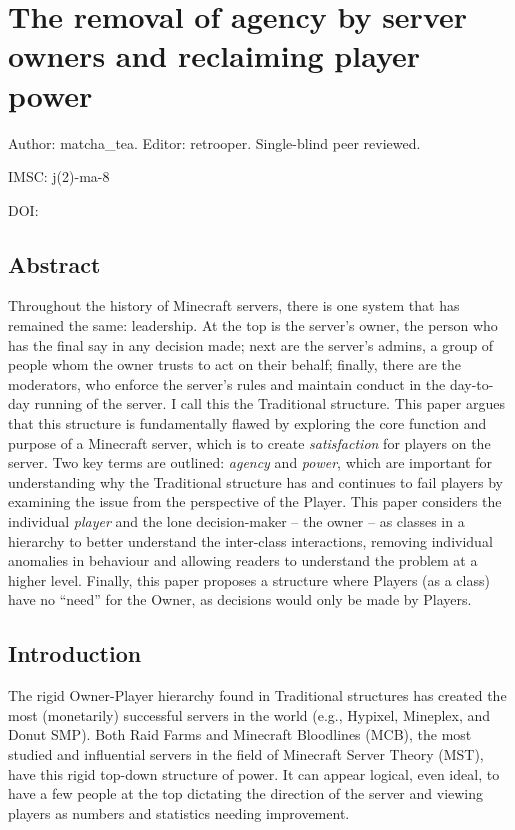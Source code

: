 \chapter{The removal of agency by server owners and reclaiming player power}

\begin{center}
    Author: matcha\_tea. Editor: retrooper. Single-blind peer reviewed. %
\end{center}

\begin{flushright}
    IMSC: j(2)-ma-8

    DOI: 
\end{flushright}


\section*{Abstract}
Throughout the history of Minecraft servers, there is one system that has remained the same: leadership. At the top is the server’s owner, the person who has the final say in any decision made; next are the server’s admins, a group of people whom the owner trusts to act on their behalf; finally, there are the moderators, who enforce the server’s rules and maintain conduct in the day-to-day running of the server. I call this the Traditional structure. This paper argues that this structure is fundamentally flawed by exploring the core function and purpose of a Minecraft server, which is to create \emph{satisfaction} for players on the server. Two key terms are outlined: \emph{agency} and \emph{power}, which are important for understanding why the Traditional structure has and continues to fail players by examining the issue from the perspective of the Player. This paper considers the individual \emph{player} and the lone decision-maker – the owner – as classes in a hierarchy to better understand the inter-class interactions, removing individual anomalies in behaviour and allowing readers to understand the problem at a higher level. Finally, this paper proposes a structure where Players (as a class) have no “need” for the Owner, as decisions would only be made by Players.

\section{Introduction}
The rigid Owner-Player hierarchy found in Traditional structures has created the most (monetarily) successful servers in the world (e.g., Hypixel, Mineplex, and Donut SMP). Both Raid Farms and Minecraft Bloodlines (MCB), the most studied and influential servers in the field of Minecraft Server Theory (MST), have this rigid top-down structure of power. It can appear logical, even ideal, to have a few people at the top dictating the direction of the server and viewing players as numbers and statistics needing improvement.

